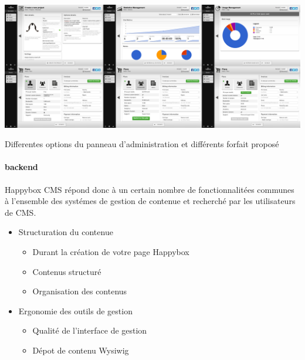 \documentclass[11pt, a4paper ]{article}
\begin{document}
\begin{spacing}{1.5}
\begin{center}
	\includegraphics[width=\textwidth]{images/HBscreen/dash.png}
	\caption{Differentes options du panneau d'administration et différents forfait proposé}
\end{center}

\paragraph{backend}




Happybox CMS répond donc à un certain nombre de fonctionnalitées communes à l'ensemble des systémes de gestion de contenue et recherché par les utilisateurs de CMS\cite{enqueteCMSSmile}.

\begin{itemize}
	\item Structuration du contenue

		\begin{itemize}
			\item Durant la création de votre page Happybox

			\item Contenus structuré

			\item Organisation des contenus

		\end{itemize}

	\item Ergonomie des outils de gestion

		\begin{itemize}
			\item Qualité de l'interface de gestion

			\item Dépot de contenu Wysiwig

		\end{itemize}


\end{itemize}
\end{spacing}
\end{document}
